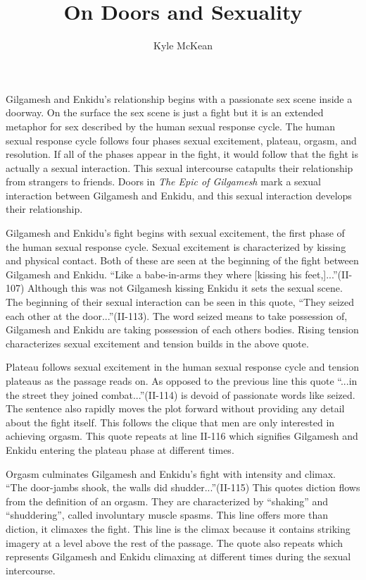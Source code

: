 \documentclass[12pt]{article}
\title{On Doors and Sexuality}
\author{Kyle McKean}
\begin{document}
\maketitle
\setlength{\parindent}{.5in}
\doublespacing

Gilgamesh and Enkidu's relationship begins with a passionate sex scene inside a
doorway. On the surface the sex scene is just a fight but it is an extended
metaphor for sex described by the human sexual response cycle.
The human sexual response cycle follows four phases sexual excitement, plateau,
orgasm, and resolution. If all of the phases appear in the fight, it would
follow that the fight is actually a sexual interaction. This sexual intercourse
catapults their relationship from strangers to friends.
Doors in \textit{The Epic of Gilgamesh} mark a sexual interaction between
Gilgamesh and Enkidu, and this sexual interaction develops their relationship.

\par

Gilgamesh and Enkidu's fight begins with sexual excitement, the first phase of
the human sexual response cycle. Sexual excitement is characterized by kissing
and physical contact. Both of these are seen at the beginning of the fight
between Gilgamesh and Enkidu.
``Like a babe-in-arms they where [kissing his feet,]...''(II-107) Although
this was not Gilgamesh kissing Enkidu it sets the sexual scene. The beginning of
their sexual interaction can be seen in this quote, ``They seized
each other at the door...''(II-113). The word seized means to take possession of,
Gilgamesh and Enkidu are taking possession of each others bodies. Rising tension
characterizes sexual excitement and tension builds in the above quote.

\par

Plateau follows sexual excitement in the human sexual response cycle and tension
plateaus as the passage reads on. As opposed to the previous line this quote
``...in the street they joined combat...''(II-114) is devoid of passionate words like
seized. The sentence also rapidly moves the plot forward without providing any
detail about the fight itself. This follows the clique that men are only
interested in achieving orgasm. This quote repeats at line II-116 which
signifies Gilgamesh and Enkidu entering the plateau phase at different times. 

\par

Orgasm culminates Gilgamesh and Enkidu's fight with intensity and climax.
``The door-jambs shook, the walls did shudder...''(II-115) This quotes diction
flows from the definition of an orgasm. They are characterized by ``shaking''
and ``shuddering'', called involuntary muscle spasms. This line offers more than
diction, it climaxes the fight. This line is the climax because it contains
striking imagery at a level above the rest of the passage. The quote also
repeats which represents Gilgamesh and Enkidu climaxing at different times during
the sexual intercourse.
\end{document}
